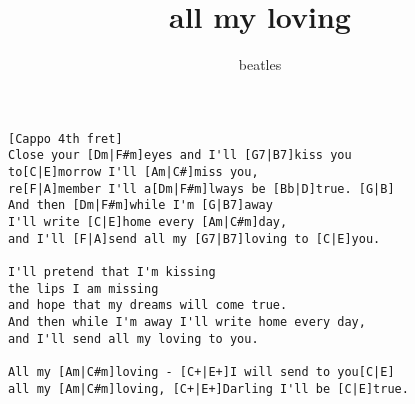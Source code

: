 \author{beatles}
\title{all my loving}
\maketitle
\begin{verbatim}
[Cappo 4th fret]
Close your [Dm|F#m]eyes and I'll [G7|B7]kiss you
to[C|E]morrow I'll [Am|C#]miss you,
re[F|A]member I'll a[Dm|F#m]lways be [Bb|D]true. [G|B]
And then [Dm|F#m]while I'm [G|B7]away
I'll write [C|E]home every [Am|C#m]day,
and I'll [F|A]send all my [G7|B7]loving to [C|E]you.

I'll pretend that I'm kissing
the lips I am missing
and hope that my dreams will come true.
And then while I'm away I'll write home every day,
and I'll send all my loving to you.

All my [Am|C#m]loving - [C+|E+]I will send to you[C|E]
all my [Am|C#m]loving, [C+|E+]Darling I'll be [C|E]true.
\end{verbatim}